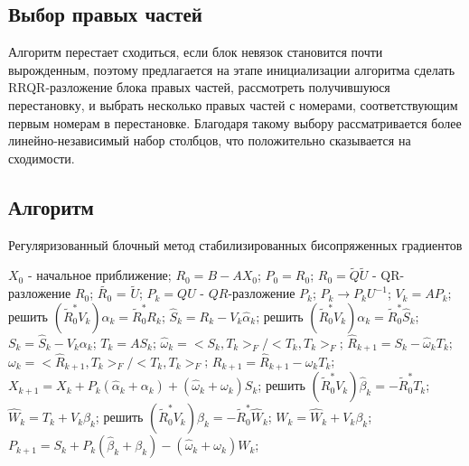 \subsection{Выбор правых частей}
Алгоритм перестает сходиться, если блок невязок становится почти вырожденным, поэтому предлагается
на этапе инициализации алгоритма сделать RRQR-разложение блока правых частей, рассмотреть получившуюся
перестановку, и выбрать несколько правых частей с номерами, соответствующим первым номерам в перестановке.
Благодаря такому выбору рассматривается более линейно-независимый набор столбцов, что положительно сказывается
на сходимости.    
\subsection{Алгоритм}
\begin{algorithm}
    \caption{Регуляризованный блочный метод стабилизированных бисопряженных градиентов}\label{alg:bbcsgr}
    \begin{algorithmic}
        \State $X_0$ - начальное приближение;
        \State $R_0 = B - AX_0$;
        \State $P_0 = R_0$;
        \State $R_0 = \tilde{Q}\tilde{U}$ - QR-разложение $R_0$;
        \State $\tilde{R_0}$ = $\tilde{U}$;
            \State $P_k = QU$ - $QR$-разложение $P_k$;
            \State $P_k \rightarrow P_kU^{-1}$;
            \State $V_k = AP_k$;
            \State решить $(\tilde{R}_0^*V_k)\hat{\alpha}_k=\tilde{R}_0^*R_k$;
            \State $\hat{S}_k = R_k - V_k\hat{\alpha}_k$;
            \State решить $(\tilde{R}_0^*V_k)\alpha_k=\tilde{R}_0^*\hat{S}_k$;
            \State $S_k = \hat{S}_k - V_k \alpha_k$;
            \State $T_k = A S_k$;
            \State $\hat{\omega}_k = <S_k,T_k>_F / <T_k,T_k>_F$;
            \State $\hat{R}_{k+1} = S_k - \hat{\omega}_kT_k$;
            \State $\omega_k = <\hat{R}_{k+1}, T_k>_F / <T_k, T_k>_F$;
            \State $R_{k+1} = \hat{R}_{k+1} - \omega_kT_k$;
            \State $X_{k+1} = X_k + P_k(\hat{\alpha}_k + \alpha_k) + (\hat{\omega}_k + \omega_k)S_k$;
            \State решить $(\tilde{R}_0^*V_k)\hat{\beta}_k=-\tilde{R}_0^*T_k$;
            \State $\hat{W}_k = T_k + V_k \hat{\beta}_k$;
            \State решить $(\tilde{R}_0^*V_k)\beta_k=-\tilde{R}_0^*\hat{W}_k$;
            \State $W_k = \hat{W}_k + V_k \beta_k$;
            \State $P_{k+1} = S_k + P_k(\hat{\beta}_k + \beta_k) - (\hat{\omega}_k + \omega_k)W_k$;
        \EndFor
    \end{algorithmic}
\end{algorithm}
